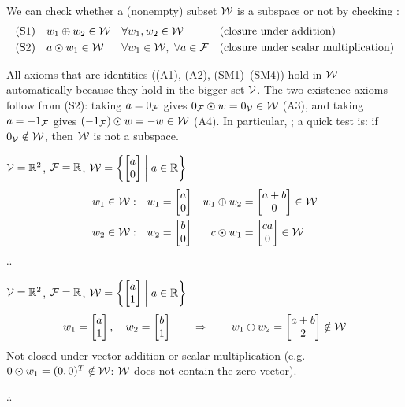 \begin{remark}
We can check whether a (nonempty) subset $\mathcal{W}$ is a subspace or not by checking :
\begin{align*}
&\text{(S1)} \quad w_1\oplus w_2\in\W && \forall w_1,w_2\in\W && \text{(closure under addition)}\\
&\text{(S2)} \quad a\odot w_1\in\W && \forall w_1\in\W,\ \forall a\in\F && \text{(closure under scalar multiplication)}
\end{align*}
\end{remark}
\begin{insight}
All axioms that are identities ((A1), (A2), (SM1)--(SM4)) hold in $\mathcal{W}$ automatically because they hold in the bigger set $\mathcal{V}$. The two existence axioms follow from (S2): taking $a=0_{\mathcal{F}}$ gives $0_{\mathcal{F}}\odot w=0_{\mathcal{V}}\in\mathcal{W}$ (A3), and taking $a=-1_{\mathcal{F}}$ gives $(-1_{\mathcal{F}})\odot w=-w\in\mathcal{W}$ (A4). In particular, ; a quick test is: if $0_{\mathcal{V}}\notin\mathcal{W}$, then $\mathcal{W}$ is not a subspace.
\end{insight}

\begin{example}
$\mathcal{V}=\mathbb{R}^2$, $\mathcal{F}=\mathbb{R}$, \quad $\mathcal{W} = \left\{ \begin{bmatrix}a\\0\end{bmatrix} \;\middle|\; a\in\mathbb{R} \right\}$
\begin{align*}
w_1\in\mathcal{W}:&\quad w_1 = \begin{bmatrix}a\\0\end{bmatrix} & w_1\oplus w_2 &= \begin{bmatrix}a+b\\0\end{bmatrix}\in\mathcal{W}\\
w_2\in\mathcal{W}:&\quad w_2 = \begin{bmatrix}b\\0\end{bmatrix} & c\odot w_1 &= \begin{bmatrix}ca\\0\end{bmatrix}\in\mathcal{W}
\end{align*}
$\therefore$ 
\end{example}

\begin{example}
$\mathcal{V}=\mathbb{R}^2$, $\mathcal{F}=\mathbb{R}$, \quad $\mathcal{W} = \left\{ \begin{bmatrix}a\\1\end{bmatrix} \;\middle|\; a\in\mathbb{R} \right\}$
\[
w_1 = \begin{bmatrix}a\\1\end{bmatrix}, \quad w_2=\begin{bmatrix}b\\1\end{bmatrix} \qquad\Rightarrow\qquad w_1\oplus w_2 = \begin{bmatrix}a+b\\2\end{bmatrix}\notin\mathcal{W}
\]
Not closed under vector addition or scalar multiplication (e.g.\ $0\odot w_1 = (0,0)^{T}\notin\mathcal{W}$: $\mathcal{W}$ does not contain the zero vector).

$\therefore$ 
\end{example}

